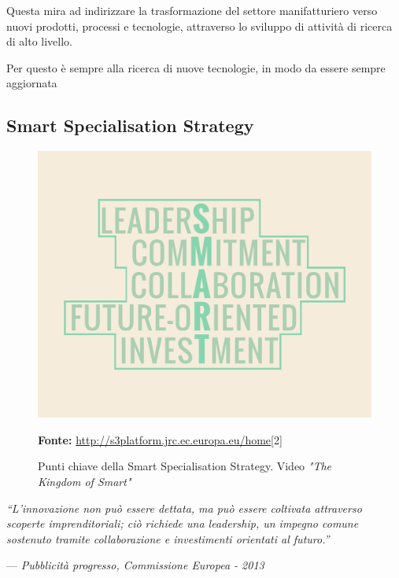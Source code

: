 Questa mira ad indirizzare la trasformazione del settore manifatturiero verso nuovi prodotti, processi e tecnologie, attraverso lo sviluppo di attività di ricerca di alto livello.

Per questo \lab{} è sempre alla ricerca di nuove tecnologie, in modo da essere sempre aggiornata 

\subsection{Smart Specialisation Strategy}
\begin{figure}[H]
	\begin{center}
	\includegraphics[scale=0.15]{immagini/SMART.png}
	\caption{Punti chiave della Smart Specialisation Strategy. Video \textit{"The Kingdom of Smart"}}
	\small{\textbf{Fonte:} \url{http://s3platform.jrc.ec.europa.eu/home}[2]}
	\end{center}
\end{figure}

\begin{flushright}{
	\slshape    
	``L'innovazione non può essere dettata, ma può essere coltivata attraverso scoperte imprenditoriali; ciò richiede una \textit{leadership}, un impegno comune sostenuto tramite collaborazione e investimenti orientati al futuro.''} 
	
	\medskip
    --- \textit{Pubblicità progresso, Commissione Europea - 2013}
\end{flushright}



